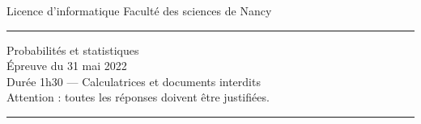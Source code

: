 \documentclass[10pt]{article}
\theoremstyle{definition}
\newtheorem{exo}{Exercice}
\newenvironment{solution}{\begin{quote}\color{teal}}{\end{quote}}
\begin{document}
\noindent Licence d'informatique \hfill Faculté des sciences de Nancy\\
\noindent\rule{\linewidth}{1pt}
\begin{center}
Probabilités et statistiques\\
Épreuve du 31 mai 2022\\
Durée 1h30 --- Calculatrices et documents interdits\\
Attention : toutes les réponses doivent être justifiées.
\end{center}
\noindent\rule{\linewidth}{1pt}





\end{document}
